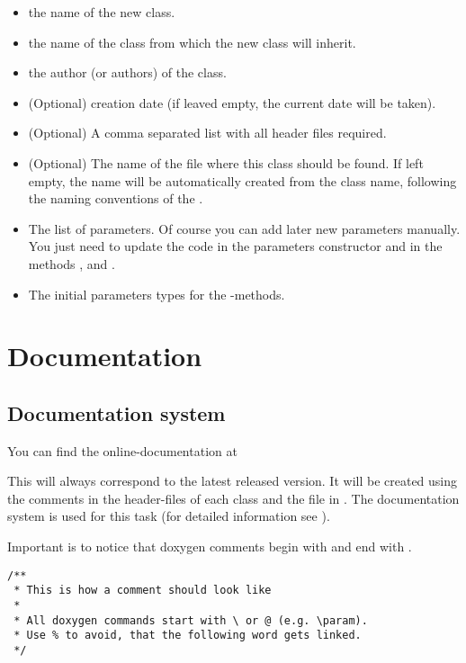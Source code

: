 \begin{itemize}
\item[\code{classname}] the name of the new class.
\item[\code{parentclass}] the name of the class from which the new class will
  inherit.
\item[\code{author}] the author (or authors) of the class.
\item[\code{date}] (Optional) creation date (if leaved empty, the current date
  will be taken).
\item[\code{includes}] (Optional) A comma separated list with all header files
  required.
\item[\code{filename}] (Optional) The name of the file where this class
  should be found.  If left empty, the name will be automatically created from
  the class name, following the naming conventions of the \ltilib.
\item[\code{parameters}] The list of parameters.  Of course you can add later
  new parameters manually. You just need to update the code in the parameters
  constructor and in the methods ,  and .
\item[\code{applytype}] The initial parameters types for the
  -methods.
\end{itemize}

\section{Documentation}
\label{sec:doku}

\subsection{Documentation system}

You can find the online-documentation at
\begin{center}
\end{center}
This will always correspond to the latest released version.  It will be
created using the comments in the header-files of each class and the file
 in .  The documentation system
 is used for this task (for detailed information see
\cite{doxygen}).

Important is to notice that doxygen comments begin with \code{/**} and end
with \code{*/}.

\begin{verbatim}
/**
 * This is how a comment should look like
 *
 * All doxygen commands start with \ or @ (e.g. \param).
 * Use % to avoid, that the following word gets linked.
 */
\end{verbatim}

